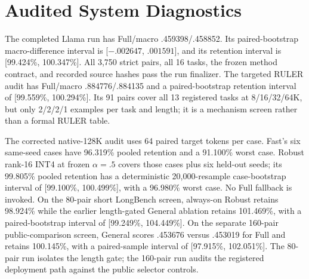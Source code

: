 \section{Audited System Diagnostics}
\label{app:system-diagnostics}

\begin{table}[!htbp]
\caption{Frozen-path execution status.  Only completed rows with validated
strict pairs fill the final result tables.}
\label{tab:audited-progress}
\centering
{}
\end{table}

The completed Llama run has Full/\method macro .459398/.458852.
Its paired-bootstrap macro-difference interval is
[$-.002647$, $.001591$], and its retention interval is
[99.424\%, 100.347\%].  All 3,750 strict pairs, all 16 tasks, the frozen
method contract, and recorded source hashes pass the run finalizer.
The targeted RULER audit has Full/\method macro .884776/.884135 and a
paired-bootstrap retention interval of [99.559\%, 100.294\%].  Its 91 pairs
cover all 13 registered tasks at 8/16/32/64K, but only 2/2/2/1 examples per
task and length; it is a mechanism screen rather than a formal RULER table.

The corrected native-128K audit uses 64 paired target tokens per case.
Fast's six same-seed cases have 96.319\% pooled retention and a 91.100\%
worst case.  Robust rank-16 INT4 at frozen $\alpha=.5$ covers those cases
plus six held-out seeds; its 99.805\% pooled retention has a deterministic
20,000-resample case-bootstrap interval of [99.100\%, 100.499\%], with a
96.980\% worst case.  No Full fallback is invoked.
On the 80-pair short LongBench screen, always-on Robust retains 98.924\%
while the earlier length-gated General ablation retains 101.469\%, with a
paired-bootstrap interval of [99.249\%, 104.449\%].
On the separate 160-pair public-comparison screen, General scores
.453676 versus .453019 for Full and retains 100.145\%, with a paired-sample
interval of [97.915\%, 102.051\%].  The 80-pair run isolates the length gate;
the 160-pair run audits the registered deployment path against the public
selector controls.

